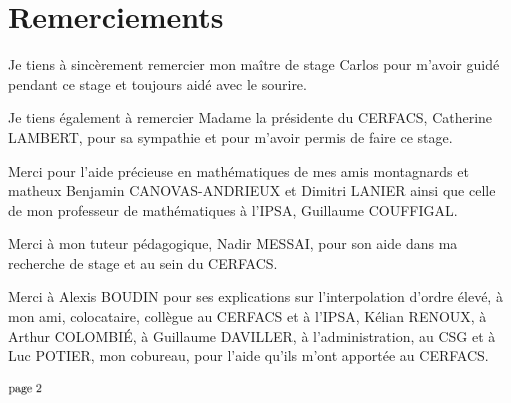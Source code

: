 \chapter*{Remerciements}

Je tiens à sincèrement remercier mon maître de stage Carlos pour m'avoir guidé pendant ce stage et toujours aidé avec le sourire.

Je tiens également à remercier Madame la présidente du CERFACS, Catherine LAMBERT, pour sa sympathie et pour m'avoir permis de faire ce stage.

Merci pour l'aide précieuse en mathématiques de mes amis montagnards et matheux Benjamin CANOVAS-ANDRIEUX et Dimitri LANIER ainsi que celle de mon professeur de mathématiques à l'IPSA, Guillaume COUFFIGAL.

Merci à mon tuteur pédagogique, Nadir MESSAI, pour son aide dans ma recherche de stage et au sein du CERFACS.

Merci à Alexis BOUDIN pour ses explications sur l'interpolation d'ordre élevé, à mon ami, colocataire, collègue au CERFACS et à l'IPSA, Kélian RENOUX, à Arthur COLOMBIÉ, à Guillaume DAVILLER, à l'administration, au CSG et à Luc POTIER, mon cobureau, pour l'aide qu'ils m'ont apportée au CERFACS.




\vspace*{\fill} %
\begin{center}
    \includegraphics[width=0.067\textwidth]{images/page_2.png}
\end{center}
\vspace*{-14cm} %
\vspace*{\fill} %
